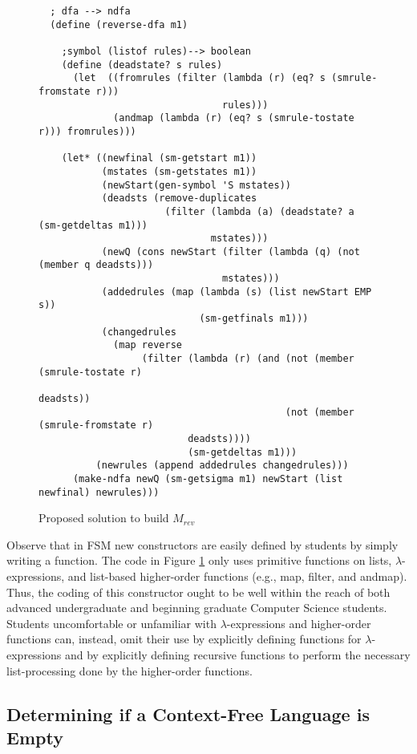 \documentclass{eptcs}
\begin{document}
\begin{figure}[t]
\begin{verbatim}
  ; dfa --> ndfa
  (define (reverse-dfa m1)

    ;symbol (listof rules)--> boolean
    (define (deadstate? s rules)
      (let  ((fromrules (filter (lambda (r) (eq? s (smrule-fromstate r)))
                                rules)))
             (andmap (lambda (r) (eq? s (smrule-tostate r))) fromrules)))

    (let* ((newfinal (sm-getstart m1))
           (mstates (sm-getstates m1))
           (newStart(gen-symbol 'S mstates))
           (deadsts (remove-duplicates
                      (filter (lambda (a) (deadstate? a (sm-getdeltas m1)))
                              mstates)))
           (newQ (cons newStart (filter (lambda (q) (not (member q deadsts)))
                                mstates)))
           (addedrules (map (lambda (s) (list newStart EMP s))
                            (sm-getfinals m1)))
           (changedrules
             (map reverse
                  (filter (lambda (r) (and (not (member (smrule-tostate r)
                                                        deadsts))
                                           (not (member (smrule-fromstate r)
                          deadsts))))
                          (sm-getdeltas m1)))
          (newrules (append addedrules changedrules)))
      (make-ndfa newQ (sm-getsigma m1) newStart (list newfinal) newrules)))
\end{verbatim}
\caption{Proposed solution to build $M_{rev}$}
\label{mrev}
\end{figure}

Observe that in \textsf{FSM} new constructors are easily defined by students by simply writing a function. The code in Figure \ref{mrev} only uses primitive functions on lists, $\lambda$-expressions, and list-based higher-order functions (e.g., \textsf{map}, \textsf{filter}, and \textsf{andmap}). Thus, the coding of this constructor ought to be well within the reach of both advanced undergraduate and beginning graduate Computer Science students. Students uncomfortable or unfamiliar with $\lambda$-expressions and higher-order functions can, instead, omit their use by explicitly defining functions for $\lambda$-expressions and by explicitly defining recursive functions to perform the necessary list-processing done by the higher-order functions.


\subsection{Determining if a Context-Free Language is Empty}
\end{document}
